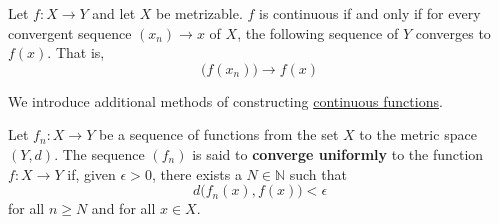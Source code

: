   \begin{theorem}
    \label{thm:sequential-continuity-on-metrizable-spaces}
    Let $f: X \to Y$ and let $X$ be metrizable. $f$ is continuous if and only if for every convergent sequence $(x_n) \rightarrow x$ of $X$, the following sequence of $Y$ converges to $f(x)$. That is, 
    \begin{equation}
      \big( f(x_n) \big) \to f(x)
    \end{equation}
  \end{theorem}

  We introduce additional methods of constructing \hyperref[def:continuous_func]{continuous functions}. 

  \begin{definition}
    \label{def:uniform-convergence}
    Let $f_n: X \to Y$ be a sequence of functions from the set $X$ to the metric space $(Y, d)$. The sequence $(f_n)$ is said to \textbf{converge uniformly} to the function $f: X \to Y$ if, given $\epsilon > 0$, there exists a $N \in \mathbb{N}$ such that
    \begin{equation}
      d\big( f_n(x), f(x)\big) < \epsilon
    \end{equation}
    for all $n \geq N$ and for all $x \in X$. 
  \end{definition}

